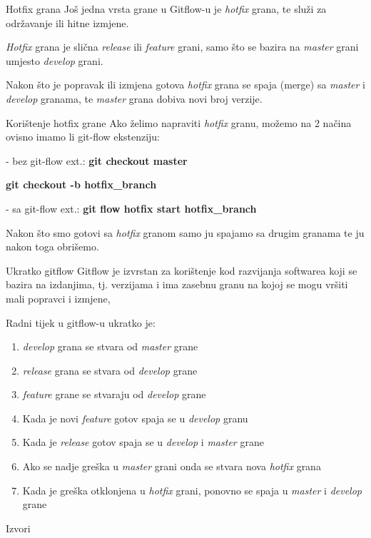 \documentclass[10pt]{beamer}
\begin{document}
\begin{frame}{Hotfix grana}
Još jedna vrsta grane u Gitflow-u je \textit{hotfix} grana, te služi za održavanje ili hitne izmjene.

\textit{Hotfix} grana je slična \textit{release} ili \textit{feature} grani, samo što se bazira na \textit{master} grani umjesto \textit{develop} grani.

Nakon što je popravak ili izmjena gotova \textit{hotfix} grana se spaja (merge) sa \textit{master} i \textit{develop} granama, te \textit{master} grana dobiva novi broj verzije.
{
\setlength{\fboxsep}{1pt}
\setlength{\fboxrule}{1pt}
}
\end{frame}
\begin{frame}{Korištenje hotfix grane}
Ako želimo napraviti \textit{hotfix} granu, možemo na 2 načina ovisno imamo li git-flow ekstenziju:

- bez git-flow ext.: \textbf{git checkout master}

\textbf{git checkout -b hotfix\_branch}
                         
- sa git-flow ext.:  \textbf{git flow hotfix start hotfix\_branch}

Nakon što smo gotovi sa \textit{hotfix} granom samo ju spajamo sa drugim granama te ju nakon toga obrišemo.
\end{frame}
\begin{frame}{Ukratko gitflow}
Gitflow je izvrstan za korištenje kod razvijanja softwarea koji se bazira na izdanjima, tj. verzijama i ima zasebnu granu na kojoj se mogu vršiti mali popravci i izmjene,

Radni tijek u gitflow-u ukratko je:
\begin{enumerate}
    \item \textit{develop} grana se stvara od \textit{master} grane
    \item \textit{release} grana se stvara od \textit{develop} grane
    \item \textit{feature} grane se stvaraju od \textit{develop} grane
    \item Kada je novi \textit{feature} gotov spaja se u \textit{develop} granu
    \item Kada je \textit{release} gotov spaja se u \textit{develop} i \textit{master} grane
    \item Ako se nadje greška u \textit{master} grani onda se stvara nova \textit{hotfix} grana
    \item Kada je greška otklonjena u \textit{hotfix} grani, ponovno se spaja u \textit{master} i \textit{develop} grane
\end{enumerate}
\end{frame}
\begin{frame}{Izvori}
\nocite{Git}
\nocite{Git1}
\nocite{Git2}


\end{frame}
\end{document}

